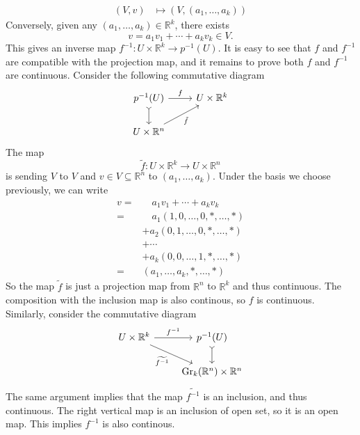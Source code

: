 \documentclass[letterpaper, 12pt]{article}
\begin{document}
\begin{solution}
\begin{align*}
     (V,v)&\mapsto (V,(a_1,\ldots,a_k))
\end{align*}
Conversely, given any \((a_1,\ldots, a_k)\in \mathbb{R}^k\), there exists 
\[v=a_1v_1+\cdots+a_kv_k\in V.\]
This gives an inverse map \(f^{-1}:U\times \mathbb{R}^k\rightarrow p^{-1}(U)\). It is easy to see that \(f\) and \(f^{-1}\) are compatible with the projection map, and it remains to prove both \(f\) and \(f^{-1}\) are continuous. Consider the following commutative diagram 
\[\begin{tikzcd}
	{p^{-1}(U)} & {U\times \mathbb{R}^k} \\
	{U\times \mathbb{R}^n}
	\arrow["f", from=1-1, to=1-2]
	\arrow[tail, from=1-1, to=2-1]
	\arrow["{\tilde{f}}"', from=2-1, to=1-2]
\end{tikzcd}\]
The map 
\[\tilde{f}:U\times \mathbb{R}^k\rightarrow U\times \mathbb{R}^n\] 
is sending \(V\) to \(V\) and \(v\in V\subseteq \mathbb{R}^n\) to \((a_1,\ldots, a_k)\). Under the basis we choose previously, we can write 
\begin{align*}
   v=&\quad a_1v_1+\cdots+a_kv_k\\ 
    =&\quad a_1(1,0,\ldots,0,*,\ldots,*)\\ 
     &+a_2(0,1,\ldots,0,*,\ldots,*)\\
     &+\cdots\\ 
     &+a_k(0,0,\ldots,1,*,\ldots,*)\\ 
    =&(a_1,\ldots,a_k,*,\ldots,*) 
\end{align*}
So the map \(\tilde{f}\) is just a projection map from \(\mathbb{R}^n\) to \(\mathbb{R}^k\) and thus continuous. The composition 
with the inclusion map is also continous, so \(f\) is continuous. Similarly, consider the commutative diagram 
\[\begin{tikzcd}
	{U\times \mathbb{R}^k} & {p^{-1}(U)} \\
	& {\text{Gr}_k(\mathbb{R}^n)\times \mathbb{R}^n}
	\arrow["{f^{-1}}", from=1-1, to=1-2]
	\arrow["{\widetilde{f^{-1}}}"', from=1-1, to=2-2]
	\arrow[tail, from=1-2, to=2-2]
\end{tikzcd}\]
The same argument implies that the map \(\widetilde{f^{-1}}\) is an inclusion, and thus continuous. The right vertical map is an inclusion of open set, so it is an open map. This implies \(f^{-1}\) is also continous. 
\end{solution}
\end{document}
